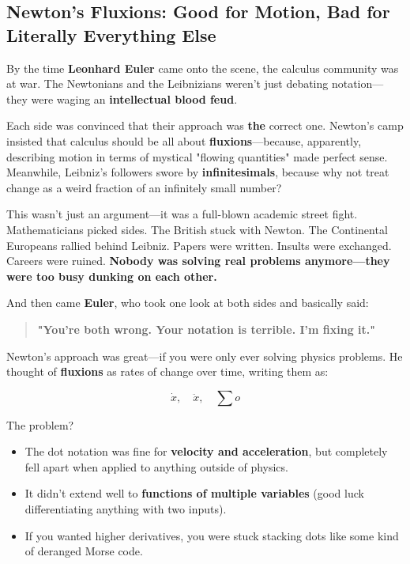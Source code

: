 \subsection{Newton’s Fluxions: Good for Motion, Bad for Literally Everything Else}  

By the time \textbf{Leonhard Euler} came onto the scene, the calculus community was at war. The Newtonians and the Leibnizians weren’t just debating notation—they were waging an \textbf{intellectual blood feud}.  

Each side was convinced that their approach was \textbf{the} correct one. Newton’s camp insisted that calculus should be all about \textbf{fluxions}—because, apparently, describing motion in terms of mystical "flowing quantities" made perfect sense. Meanwhile, Leibniz’s followers swore by \textbf{infinitesimals}, because why not treat change as a weird fraction of an infinitely small number?  

This wasn’t just an argument—it was a full-blown academic street fight. Mathematicians picked sides. The British stuck with Newton. The Continental Europeans rallied behind Leibniz. Papers were written. Insults were exchanged. Careers were ruined. \textbf{Nobody was solving real problems anymore—they were too busy dunking on each other.}  

And then came \textbf{Euler}, who took one look at both sides and basically said:  

\begin{quote}
    \textbf{"You're both wrong. Your notation is terrible. I'm fixing it."}
\end{quote}  

Newton’s approach was great—if you were only ever solving physics problems. He thought of \textbf{fluxions} as rates of change over time, writing them as:

\[
\dot{x}, \quad \ddot{x}, \quad \sum o
\]

The problem?  

\begin{itemize}
    \item The dot notation was fine for \textbf{velocity and acceleration}, but completely fell apart when applied to anything outside of physics.
    \item It didn’t extend well to \textbf{functions of multiple variables} (good luck differentiating anything with two inputs).
    \item If you wanted higher derivatives, you were stuck stacking dots like some kind of deranged Morse code.  
\end{itemize}
